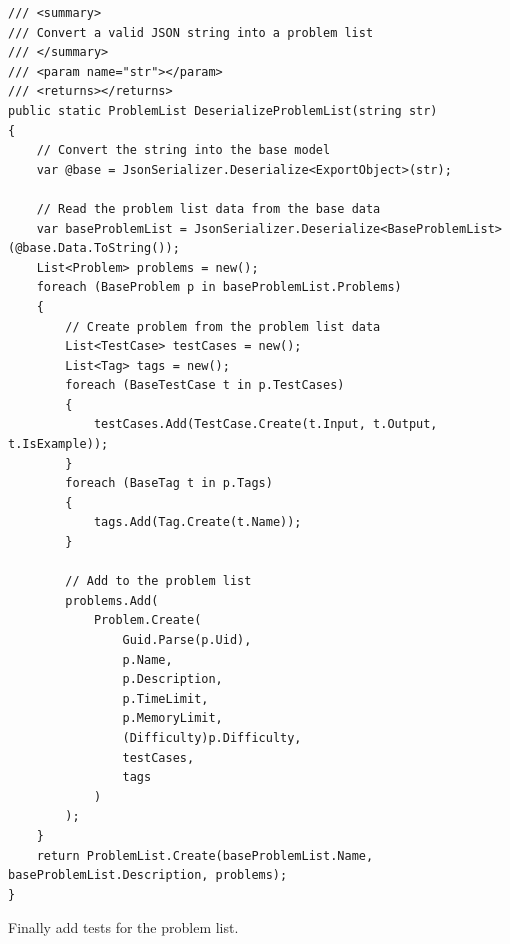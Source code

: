 \documentclass[a4paper]{report}
\begin{document}
\begin{verbatim}
/// <summary>
/// Convert a valid JSON string into a problem list
/// </summary>
/// <param name="str"></param>
/// <returns></returns>
public static ProblemList DeserializeProblemList(string str)
{
    // Convert the string into the base model
    var @base = JsonSerializer.Deserialize<ExportObject>(str);

    // Read the problem list data from the base data
    var baseProblemList = JsonSerializer.Deserialize<BaseProblemList>(@base.Data.ToString());
    List<Problem> problems = new();
    foreach (BaseProblem p in baseProblemList.Problems)
    {
        // Create problem from the problem list data
        List<TestCase> testCases = new();
        List<Tag> tags = new();
        foreach (BaseTestCase t in p.TestCases)
        {
            testCases.Add(TestCase.Create(t.Input, t.Output, t.IsExample));
        }
        foreach (BaseTag t in p.Tags)
        {
            tags.Add(Tag.Create(t.Name));
        }

        // Add to the problem list
        problems.Add(
            Problem.Create(
                Guid.Parse(p.Uid),
                p.Name,
                p.Description,
                p.TimeLimit,
                p.MemoryLimit,
                (Difficulty)p.Difficulty,
                testCases,
                tags
            )
        );
    }
    return ProblemList.Create(baseProblemList.Name, baseProblemList.Description, problems);
}
\end{verbatim}

Finally add tests for the problem list.
\end{document}
